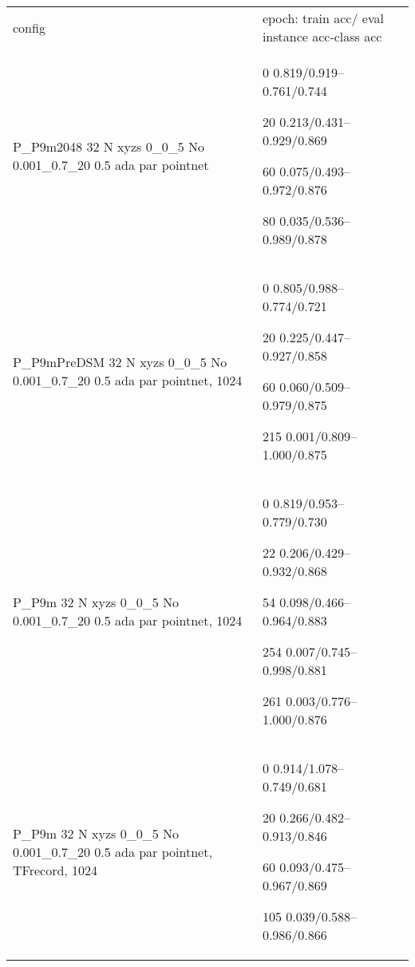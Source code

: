 \documentclass[,table,dvipsnames]{article}
\begin{document}
\noindent\begin{tabular}{|p{10cm}|p{5.5cm}| }	
	\hline
	
	config & epoch: train acc/ eval instance acc-class acc\\
	
	\rowcolor{green!20}
	P\_P9m2048 32 N xyzs 0\_0\_5 No 0.001\_0.7\_20 0.5 ada par pointnet & 0 0.819/0.919--0.761/0.744\par 20 0.213/0.431--0.929/0.869 \par 60 0.075/0.493--0.972/0.876 \par 80 0.035/0.536--0.989/0.878 \\
	
	\rowcolor{yellow!20}
	P\_P9mPreDSM 32 N xyzs 0\_0\_5 No 0.001\_0.7\_20 0.5 ada par pointnet, 1024 & 0 0.805/0.988--0.774/0.721 \par 20 0.225/0.447--0.927/0.858 \par  60 0.060/0.509--0.979/0.875 \par 215 0.001/0.809--1.000/0.875\\
	
	\rowcolor{green!20}
	P\_P9m 32 N xyzs 0\_0\_5 No 0.001\_0.7\_20 0.5 ada par pointnet, 1024 & 0 0.819/0.953--0.779/0.730 \par 22 0.206/0.429--0.932/0.868\par 54 0.098/0.466--0.964/0.883 \par 254 0.007/0.745--0.998/0.881 \par 261 0.003/0.776--1.000/0.876\\
	
	\rowcolor{yellow!20}
	P\_P9m 32 N xyzs 0\_0\_5 No 0.001\_0.7\_20 0.5 ada par pointnet, TFrecord, 1024 & 0 0.914/1.078--0.749/0.681 \par 20 0.266/0.482--0.913/0.846 \par 60 0.093/0.475--0.967/0.869 \par 105 0.039/0.588--0.986/0.866 \\
	\hline 	
\end{tabular}
\end{document}
